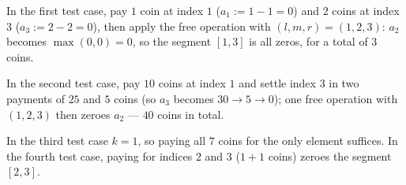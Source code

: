 In the first test case, pay $1$ coin at index $1$ ($a_1 := 1 - 1 = 0$) and $2$ coins at index $3$ ($a_3 := 2 - 2 = 0$), then apply the free operation with $(l, m, r) = (1, 2, 3)$: $a_2$ becomes $\max(0, 0) = 0$, so the segment $[1, 3]$ is all zeros, for a total of $3$ coins.

In the second test case, pay $10$ coins at index $1$ and settle index $3$ in two payments of $25$ and $5$ coins (so $a_3$ becomes $30 \to 5 \to 0$); one free operation with $(1, 2, 3)$ then zeroes $a_2$ --- $40$ coins in total.

In the third test case $k = 1$, so paying all $7$ coins for the only element suffices. In the fourth test case, paying for indices $2$ and $3$ ($1 + 1$ coins) zeroes the segment $[2, 3]$.
